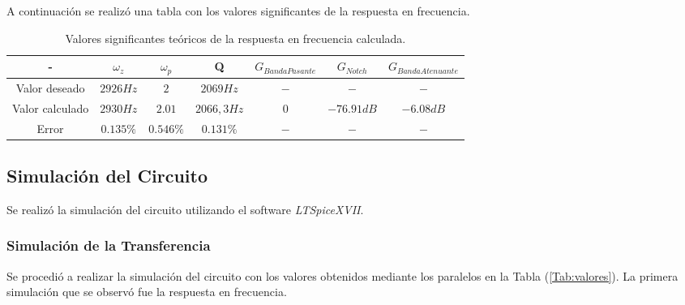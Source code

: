 \documentclass[a4paper]{article}
\begin{document}
A continuación se realizó una tabla con los valores significantes de la respuesta en frecuencia.

\begin{table}[H]
\centering
\begin{tabular}{@{}ccccccc@{}}
\toprule
- & $\omega_z$ & $\omega_p$ & Q & $G_{Banda Pasante}$  & $G_{Notch}$ & $G_{Banda Atenuante}$ \\ \midrule
Valor deseado & $2926Hz$ & $2$ & $2069Hz$ & $-$ & $-$ & $-$ \\
Valor calculado & $2930Hz$ & $2.01$ & $2066,3Hz$ & $0$ & $-76.91dB$ & $-6.08dB$ \\ 
Error & $0.135\%$ & $0.546\%$ & $0.131\%$ & $-$ & $-$ & $-$ \\ \bottomrule
\end{tabular}
\caption{Valores significantes teóricos de la respuesta en frecuencia calculada.}
\label{tab:rta_freq_calc}
\end{table}

\subsection{Simulación del Circuito}
\label{sec:simulacion}

Se realizó la simulación del circuito utilizando el software \textit{LTSpiceXVII}.

\subsubsection{Simulación de la Transferencia}

Se procedió a realizar la simulación del circuito con los valores obtenidos mediante los paralelos en la Tabla (\ref{Tab:valores}). La primera simulación que se observó fue la respuesta en frecuencia.
\end{document}
